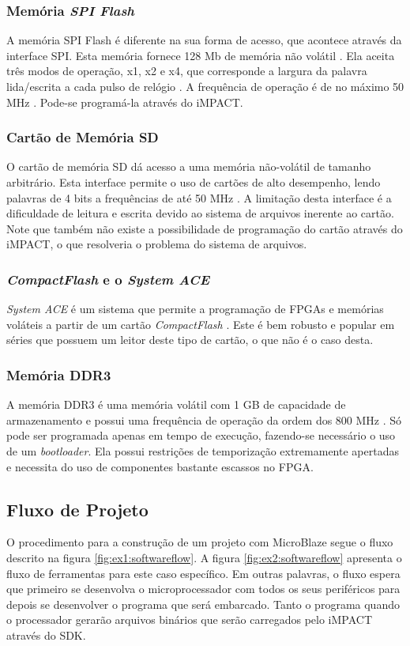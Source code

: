 \documentclass[11pt,a4paper,oneside]{book}
\begin{document}
\subsubsection{Memória \textit{SPI Flash}}
A memória SPI Flash é diferente na sua forma de acesso, que acontece através da interface SPI.
Esta memória fornece 128 Mb de memória não volátil \cite{ug810}.
Ela aceita três modos de operação, x1, x2 e x4, que corresponde a largura da palavra lida/escrita a cada pulso de relógio \cite{N25Q128}.
A frequência de operação é de no máximo 50 MHz \cite{xapp586}.
Pode-se programá-la através do iMPACT.

\subsubsection{Cartão de Memória SD}
O cartão de memória SD dá acesso a uma memória não-volátil de tamanho arbitrário.
Esta interface permite o uso de cartões de alto desempenho, lendo palavras de 4 bits a frequências de até 50 MHz \cite{ug810}.
A limitação desta interface é a dificuldade de leitura e escrita devido ao sistema de arquivos inerente ao cartão.
Note que também não existe a possibilidade de programação do cartão através do iMPACT, o que resolveria o problema do sistema de arquivos.

\subsubsection{\textit{CompactFlash} e o \textit{System ACE}}
\textit{System ACE} é um sistema que permite a programação de FPGAs e memórias voláteis a partir de um cartão \textit{CompactFlash} \cite{ds080, ds583}.
Este é bem robusto e popular em séries que possuem um leitor deste tipo de cartão, o que não é o caso desta.

\subsubsection{Memória DDR3}
A memória DDR3 é uma memória volátil com 1 GB de capacidade de armazenamento e possui uma frequência de operação da ordem dos 800 MHz \cite{MT8JTF12864HZ}.
Só pode ser programada apenas em tempo de execução, fazendo-se necessário o uso de um \textit{bootloader}.
Ela possui restrições de temporização extremamente apertadas e necessita do uso de componentes bastante escassos no FPGA.

\subsection{Fluxo de Projeto}
O procedimento para a construção de um projeto com MicroBlaze segue o fluxo descrito na figura \ref{fig:ex1:softwareflow}.
A figura \ref{fig:ex2:softwareflow} apresenta o fluxo de ferramentas para este caso específico.
Em outras palavras, o fluxo espera que primeiro se desenvolva o microprocessador com todos os seus periféricos para depois se desenvolver o programa que será embarcado.
Tanto o programa quando o processador gerarão arquivos binários que serão carregados pelo iMPACT através do SDK.
\end{document}

